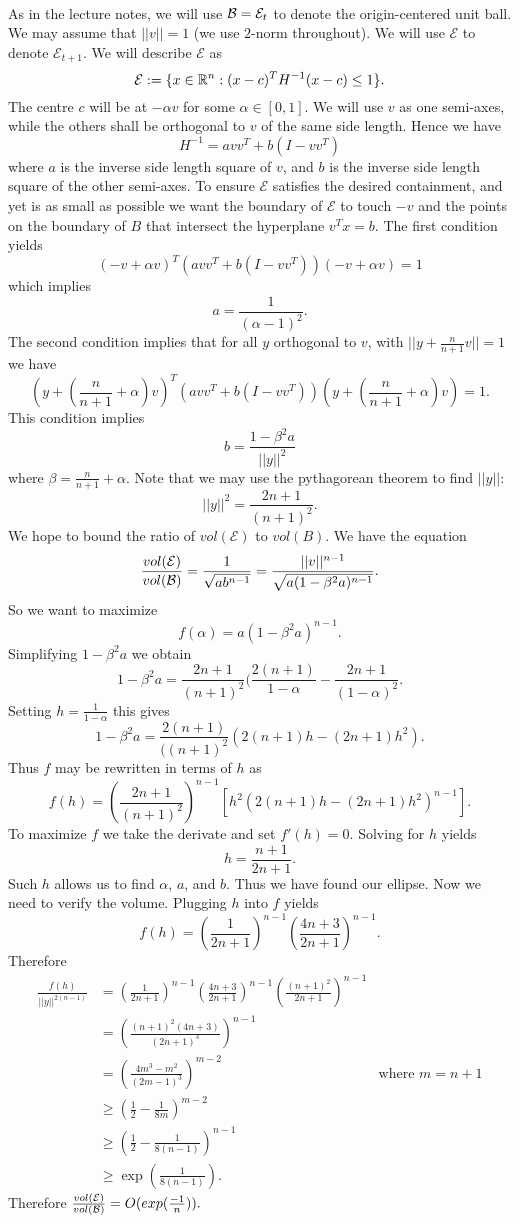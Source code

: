 \documentclass[letterpaper,12pt,oneside,onecolumn]{article}
\newcommand{\cE}{\mathcal{E}} \newcommand{\cF}{\mathcal{F}}
\begin{document}
\paragraph{}
As in the lecture notes, we will use $\cB = \cE_t$ to denote the origin-centered unit ball. We may assume that $||v|| =1$ (we use $2$-norm throughout). We will use $\cE$ to denote $\cE_{t+1}$. We will describe $\cE$ as 
$$\cE := \{x \in \R^n : (x-c)^TH^{-1}(x-c) \leq 1\}.$$
The centre $c$ will be at $-\alpha v$ for some $\alpha \in [0,1]$. We will use $v$ as one semi-axes, while the others shall be orthogonal to $v$ of the same side length. Hence we have
$$H^{-1} = avv^T + b(I - vv^T)$$
where $a$ is the inverse side length square of $v$, and $b$ is the inverse side length square of the other semi-axes. To ensure $\cE$ satisfies the desired containment, and yet is as small as possible we want the boundary of $\cE$ to touch $-v$ and the points on the boundary of $B$ that intersect the hyperplane $v^Tx = b$. The first condition yields
$$(-v+\alpha v)^T(avv^T + b(I-vv^T))(-v+\alpha v) = 1$$
which implies
$$a = \frac{1}{(\alpha-1)^2}.$$
The second condition implies that for all $y$ orthogonal to $v$, with $||y + \frac{n}{n+1}v || =1$ we have
$$(y + (\frac{n}{n+1} + \alpha)v)^T(avv^T + b(I-vv^T))(y+(\frac{n}{n+1} + \alpha)v) = 1.$$
This condition implies
$$ b = \frac{1-\beta^2a}{||y||^2}$$
where $\beta = \frac{n}{n+1} + \alpha.$ Note that we may use the pythagorean theorem to find $||y||$:
$$||y||^2 =\frac{2n+1}{(n+1)^2}.$$ 
We hope to bound the ratio of $vol(\cE)$ to $vol(B)$. We have the equation
$$\frac{vol(\cE)}{vol(\cB)} = \frac{1}{\sqrt{ab^{n-1}}} = \frac{||v||^{n-1}}{\sqrt{a(1-\beta^2a)^{n-1}}}.$$
So we want to maximize
$$f(\alpha) = a(1-\beta^2a)^{n-1}.$$
Simplifying $1-\beta^2a$ we obtain
$$1-\beta^2a = \frac{2n+1}{(n+1)^2}(\frac{2(n+1)}{1-\alpha} - \frac{2n+1}{(1-\alpha)^2}.$$
Setting $h = \frac{1}{1-\alpha}$ this gives
$$1-\beta^2a = \frac{2(n+1)}{((n+1)^2}(2(n+1)h - (2n+1)h^2).$$
Thus $f$ may be rewritten in terms of $h$ as
$$f(h) = (\frac{2n+1}{(n+1)^2})^{n-1}[h^2(2(n+1)h - (2n+1)h^2)^{n-1}].$$
To maximize $f$ we take the derivate and set $f'(h) = 0$. Solving for $h$ yields
$$h = \frac{n+1}{2n+1}.$$
Such $h$ allows us to find $\alpha$, $a$, and $b$. Thus we have found our ellipse. Now we need to verify the volume. Plugging $h$ into $f$ yields
$$f(h) = (\frac{1}{2n+1})^{n-1}(\frac{4n+3}{2n+1})^{n-1}.$$
Therefore
\begin{align*}
\frac{f(h)}{||y||^{2(n-1)}} &= (\frac{1}{2n+1})^{n-1}(\frac{4n+3}{2n+1})^{n-1}(\frac{(n+1)^2}{2n+1})^{n-1} \\
&=(\frac{(n+1)^2(4n+3)}{(2n+1)^3})^{n-1} \\
&= (\frac{4m^3 - m^2}{(2m-1)^3})^{m-2} &\text{where $m=n+1$} \\
&\geq (\frac{1}{2} - \frac{1}{8m})^{m-2} \\
&\geq (\frac{1}{2}- \frac{1}{8(n-1)})^{n-1} \\
&\geq \exp(\frac{1}{8(n-1)}).
\end{align*}
Therefore $\frac{vol(\cE)}{vol(\cB)} = O(exp(\frac{-1}{n})).$
\end{document}
